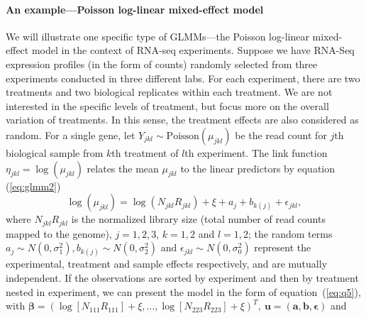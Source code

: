 \paragraph{An example---Poisson log-linear mixed-effect model}\label{poisson} 
We will illustrate one specific type of GLMMs---the Poisson log-linear mixed-effect model in the 
context of RNA-seq experiments. Suppose we have RNA-Seq expression profiles (in the form of 
counts)
randomly selected from three experiments conducted in three different labs. For each experiment, 
there are two treatments and two biological replicates within each treatment. We are not interested 
in the specific levels of treatment, but focus
more on the overall variation of treatments. In this sense, the treatment effects are also
considered as random. For a single gene, let $Y_{jkl}\sim \text{Poisson}(\mu_{jkl})$ be the read
count for $j$th biological sample from $k$th treatment of $l$th experiment. The link function
$\eta_{jkl} = \log (\mu_{jkl})$ relates the mean $\mu_{jkl}$ to the linear predictors by equation
(\ref{eq:glmm2})  
\begin{equation}\label{eq:example}
	\log (\mu_{jkl}) = \log (N_{jkl}R_{jkl}) + \xi + a_{j} + b_{k(j)} + \epsilon_{jkl},
\end{equation}
where $N_{jkl}R_{jkl}$ is the normalized library size (total number of read counts mapped to the
genome),  $j=1, 2,  3$, $k=1, 2$ and $l=1, 2$; the random terms $a_j \sim N(0, \sigma_1^2), 
b_{k(j)}\sim N(0,\sigma_2^2)$ and $\epsilon_{jkl}\sim N(0, \sigma_0^2)$ represent the experimental, 
treatment and sample effects respectively, and are mutually independent. If
the observations are sorted by experiment and then by treatment nested in experiment, we can present
the model in the form of equation~(\ref{eq:q5}), with  $\bm \beta = (\log [N_{111}R_{111}]  +
\xi,\ldots, \log [N_{223}R_{223}]  + \xi)^T, ~\bm u = (\bm a, \bm b, \bm \epsilon)$ and 
